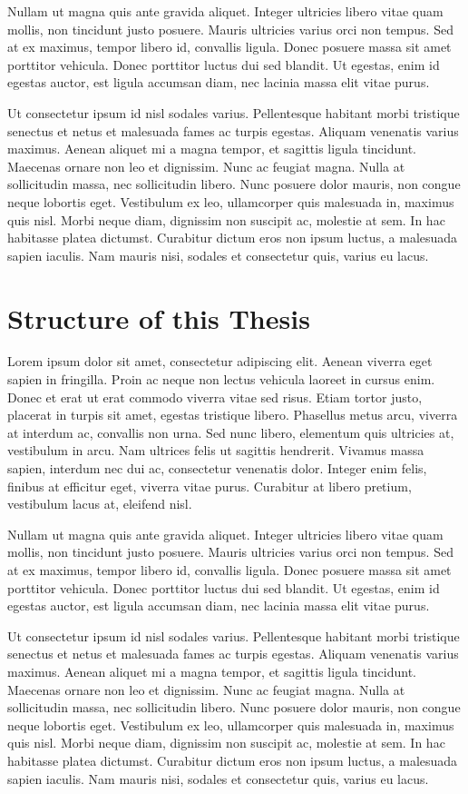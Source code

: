 Nullam ut magna quis ante gravida aliquet. Integer ultricies libero vitae quam mollis, non tincidunt justo posuere. Mauris ultricies varius orci non tempus. Sed at ex maximus, tempor libero id, convallis ligula. Donec posuere massa sit amet porttitor vehicula. Donec porttitor luctus dui sed blandit. Ut egestas, enim id egestas auctor, est ligula accumsan diam, nec lacinia massa elit vitae purus.

Ut consectetur ipsum id nisl sodales varius. Pellentesque habitant morbi tristique senectus et netus et malesuada fames ac turpis egestas. Aliquam venenatis varius maximus. Aenean aliquet mi a magna tempor, et sagittis ligula tincidunt. Maecenas ornare non leo et dignissim. Nunc ac feugiat magna. Nulla at sollicitudin massa, nec sollicitudin libero. Nunc posuere dolor mauris, non congue neque lobortis eget. Vestibulum ex leo, ullamcorper quis malesuada in, maximus quis nisl. Morbi neque diam, dignissim non suscipit ac, molestie at sem. In hac habitasse platea dictumst. Curabitur dictum eros non ipsum luctus, a malesuada sapien iaculis. Nam mauris nisi, sodales et consectetur quis, varius eu lacus.


\section{Structure of this Thesis}

Lorem ipsum dolor sit amet, consectetur adipiscing elit. Aenean viverra eget sapien in fringilla. Proin ac neque non lectus vehicula laoreet in cursus enim. Donec et erat ut erat commodo viverra vitae sed risus. Etiam tortor justo, placerat in turpis sit amet, egestas tristique libero. Phasellus metus arcu, viverra at interdum ac, convallis non urna. Sed nunc libero, elementum quis ultricies at, vestibulum in arcu. Nam ultrices felis ut sagittis hendrerit. Vivamus massa sapien, interdum nec dui ac, consectetur venenatis dolor. Integer enim felis, finibus at efficitur eget, viverra vitae purus. Curabitur at libero pretium, vestibulum lacus at, eleifend nisl.

Nullam ut magna quis ante gravida aliquet. Integer ultricies libero vitae quam mollis, non tincidunt justo posuere. Mauris ultricies varius orci non tempus. Sed at ex maximus, tempor libero id, convallis ligula. Donec posuere massa sit amet porttitor vehicula. Donec porttitor luctus dui sed blandit. Ut egestas, enim id egestas auctor, est ligula accumsan diam, nec lacinia massa elit vitae purus.

Ut consectetur ipsum id nisl sodales varius. Pellentesque habitant morbi tristique senectus et netus et malesuada fames ac turpis egestas. Aliquam venenatis varius maximus. Aenean aliquet mi a magna tempor, et sagittis ligula tincidunt. Maecenas ornare non leo et dignissim. Nunc ac feugiat magna. Nulla at sollicitudin massa, nec sollicitudin libero. Nunc posuere dolor mauris, non congue neque lobortis eget. Vestibulum ex leo, ullamcorper quis malesuada in, maximus quis nisl. Morbi neque diam, dignissim non suscipit ac, molestie at sem. In hac habitasse platea dictumst. Curabitur dictum eros non ipsum luctus, a malesuada sapien iaculis. Nam mauris nisi, sodales et consectetur quis, varius eu lacus.
